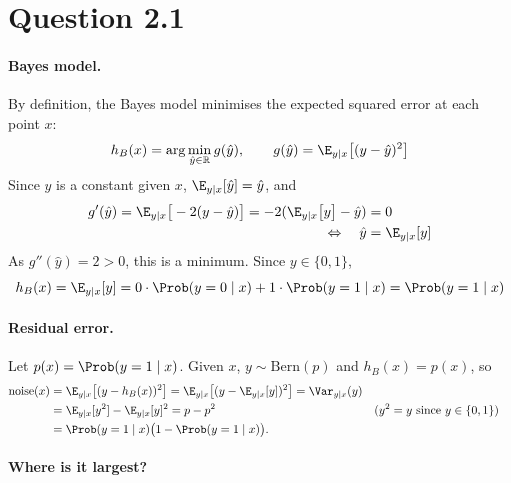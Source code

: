 \section{Question 2.1}\label{2.1}
\paragraph{Bayes model.}
By definition, the Bayes model minimises the expected squared error at each point $x$:
\begin{equation*}
    h_B(x) = \arg\min_{\hat{y}\in \mathbb{R}} g(\hat{y}), \qquad g(\hat{y})= \E_{y\mid x}\big[(y-\hat{y})^2\big]
\end{equation*}
Since $\hat{y}$ is a constant given $x$, $\E_{y\mid x}[\hat{y}]=\hat{y}$, and
\begin{align*}
    g'(\hat{y}) = \E_{y\mid x}\big[-2(y-\hat{y})\big] = -2(\E_{y\mid x}\big[y\big]-\hat{y})&=0\\
    \Leftrightarrow \quad \hat{y}&=\E_{y\mid x}[y]
\end{align*}
As $g''(\hat{y}) = 2 > 0$, this is a minimum. Since $y \in \{0, 1\}$,
\begin{equation*}
    h_B(x) = \E_{y \mid x}[y] = 0\cdot\Prob(y=0\mid x) + 1\cdot\Prob(y=1\mid x) = \Prob(y=1\mid x)
\end{equation*}
\paragraph{Residual error.}
Let $p(x)=\Prob(y=1\mid x)$. Given $x$, $y \sim \mathrm{Bern}(p)$ and $h_B(x)=p(x)$, so
\begin{align*}
    \text{noise}(x)&=\E_{y\mid x}\big[(y-h_B(x))^2\big]=\E_{y\mid x}\big[(y-\E_{y\mid x}[y])^2\big]=\Var_{y\mid x}(y) \\
    &=\E_{y\mid x}[y^2] - \E_{y\mid x}[y]^2 = p - p^2 && (y^2 = y \text{ since } y \in \{0, 1\}) \\
    &=\Prob(y=1\mid x)\big(1-\Prob(y=1\mid x)\big).
\end{align*}

\paragraph{Where is it largest?}


